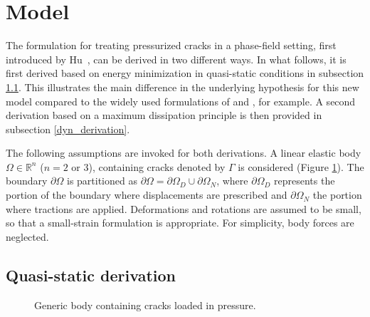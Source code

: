 \section{Model}
\label{sec:model}

The formulation for treating pressurized cracks in a phase-field setting, first introduced by Hu~\cite{hu2021variationalthesis}, can be derived in two different ways.  In what follows, it is first derived based on energy minimization in quasi-static conditions in subsection \ref{qs_derivation}. This illustrates the main difference in the underlying hypothesis for this new model compared to the widely used formulations of \cite{bourdin2012variational} and \cite{mikelic2015quasi}, for example. A second derivation based on a maximum dissipation principle is then provided in subsection \ref{dyn_derivation}. 

The following assumptions are invoked for both derivations. A linear elastic body $\Omega \in \mathbb{R}^n$ ($n = 2$ or $3$), containing cracks denoted by $\Gamma$ is considered (Figure \ref{fig:potato}). The boundary $\partial\Omega$ is partitioned as $\partial\Omega = \partial\Omega_D \cup \partial\Omega_N$, where $\partial\Omega_D$ represents the portion of the boundary where displacements are prescribed and $\partial\Omega_N$ the portion where tractions are applied. Deformations and rotations are assumed to be small, so that a small-strain formulation is appropriate.  For simplicity, body forces are neglected.

\subsection{Quasi-static derivation}\label{qs_derivation}

\begin{figure}[ht]
    \centering
    \caption{Generic body containing cracks loaded in pressure.}
    \label{fig:potato}
\end{figure}

